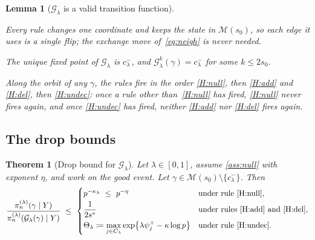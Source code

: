 \documentclass[aos]{imsart}
\theoremstyle{plain}
\newtheorem{theorem}{Theorem}[section]
\newtheorem{lemma}{Lemma}[section]
\theoremstyle{definition}
\begin{document}
    \begin{lemma}[$\mathcal{G}_\lambda$ is a valid transition function]
        \label{lemma:Gvalid}
        \begin{equivcond}
            \item\label{it:gv_i} Every rule changes one coordinate and keeps
            the state in $\mathscr{M}(s_0)$, so each edge it uses is a single
            flip; the exchange move of~\eqref{eq:neigh} is never needed.
            \item\label{it:gv_ii} The unique fixed point of
            $\mathcal{G}_\lambda$ is $c^{-}_\lambda$, and
            $\mathcal{G}_\lambda^{k}(\gamma)=c^{-}_\lambda$ for some
            $k\leq2s_0$.
            \item\label{it:gv_iii} Along the orbit of any $\gamma$, the rules
            fire in the order \ref{H:null}, then \ref{H:add} and
            \ref{H:del}, then \ref{H:undec}: once a rule other
            than~\ref{H:null} has fired, \ref{H:null} never fires again, and
            once \ref{H:undec} has fired, neither \ref{H:add} nor
            \ref{H:del} fires again.
        \end{equivcond}
    \end{lemma}

    \subsection{The drop bounds}
    \label{sub:dropsG}

    \begin{theorem}[Drop bound for $\mathcal{G}_\lambda$]
        \label{th:dropG}
        Let $\lambda\in[0,1]$, assume \cref{ass:null} with exponent $\eta$,
        and work on the good event. Let
        $\gamma\in\mathscr{M}(s_0)\setminus\{c^{-}_\lambda\}$. Then
        \begin{equation}
            \label{eq:dropG}
            \frac{\pi_n^{(\lambda)}(\gamma\mid Y)}
            {\pi_n^{(\lambda)}(\mathcal{G}_\lambda(\gamma)\mid Y)}
            \ \leq\
            \begin{cases}
                p^{-\kappa_\lambda}\ \leq\ p^{-\eta}
                & \text{under rule~\ref{H:null}},\\[1mm]
                \dfrac{1}{2s^{\ast}} & \text{under rules~\ref{H:add}
                and~\ref{H:del}},\\[2mm]
                \Theta_\lambda\coloneq\max\limits_{j\in C_\lambda}
                \exp\bigl\{\lambda\psi_j^{+}-\kappa\log p\bigr\}
                & \text{under rule~\ref{H:undec}} .
            \end{cases}
        \end{equation}
    \end{theorem}
\end{document}
